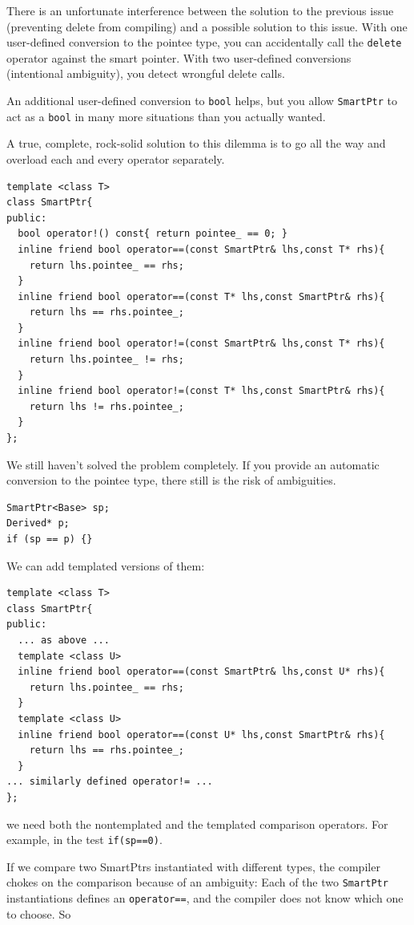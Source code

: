 There is an unfortunate interference between the solution to the
previous issue (preventing delete from compiling) and a possible
solution to this issue. With one user-defined conversion to the
pointee type, you can accidentally call the \texttt{delete} operator against
the smart pointer. With two user-defined conversions 
(intentional ambiguity), you detect wrongful delete calls.

An additional user-defined conversion to \texttt{bool} helps, but you
allow \texttt{SmartPtr} to act as a \texttt{bool} in many more
situations than you actually wanted.

A true, complete, rock-solid solution to this dilemma is to go all the
way and overload each and every operator separately.
\begin{verbatim}
template <class T>
class SmartPtr{
public:
  bool operator!() const{ return pointee_ == 0; }
  inline friend bool operator==(const SmartPtr& lhs,const T* rhs){
    return lhs.pointee_ == rhs; 
  }
  inline friend bool operator==(const T* lhs,const SmartPtr& rhs){
    return lhs == rhs.pointee_; 
  }
  inline friend bool operator!=(const SmartPtr& lhs,const T* rhs){ 
    return lhs.pointee_ != rhs; 
  }
  inline friend bool operator!=(const T* lhs,const SmartPtr& rhs){
    return lhs != rhs.pointee_; 
  }
};
\end{verbatim}

We still haven't solved the problem completely. If you provide an
automatic conversion to the pointee type, there still is the risk of
ambiguities.
\begin{verbatim}
SmartPtr<Base> sp;
Derived* p;
if (sp == p) {}
\end{verbatim}

We can add templated versions of them:
\begin{verbatim}
template <class T>
class SmartPtr{
public:
  ... as above ...
  template <class U>
  inline friend bool operator==(const SmartPtr& lhs,const U* rhs){
    return lhs.pointee_ == rhs;
  }
  template <class U>
  inline friend bool operator==(const U* lhs,const SmartPtr& rhs){ 
    return lhs == rhs.pointee_; 
  }
... similarly defined operator!= ...
};
\end{verbatim}

we need both the nontemplated and the templated comparison
operators. For example, in the test \texttt{if(sp==0){}}.

 If we compare two SmartPtrs instantiated with different types, the
 compiler chokes on the comparison because of an ambiguity: Each of
 the two \texttt{SmartPtr} instantiations defines an
 \texttt{operator==}, and the compiler does not know which one to
 choose. So

